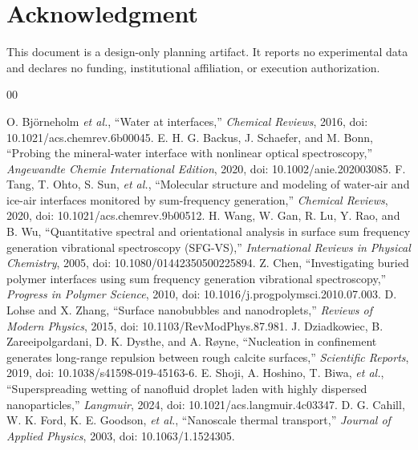 \documentclass[conference]{IEEEtran}
\begin{document}
\section*{Acknowledgment}

This document is a design-only planning artifact. It reports no experimental data and declares no funding, institutional affiliation, or execution authorization.

\begin{thebibliography}{00}

 O. Bj\"orneholm \emph{et al.}, ``Water at interfaces,'' \emph{Chemical Reviews}, 2016, doi: 10.1021/acs.chemrev.6b00045.
 E. H. G. Backus, J. Schaefer, and M. Bonn, ``Probing the mineral-water interface with nonlinear optical spectroscopy,'' \emph{Angewandte Chemie International Edition}, 2020, doi: 10.1002/anie.202003085.
 F. Tang, T. Ohto, S. Sun, \emph{et al.}, ``Molecular structure and modeling of water-air and ice-air interfaces monitored by sum-frequency generation,'' \emph{Chemical Reviews}, 2020, doi: 10.1021/acs.chemrev.9b00512.
 H. Wang, W. Gan, R. Lu, Y. Rao, and B. Wu, ``Quantitative spectral and orientational analysis in surface sum frequency generation vibrational spectroscopy (SFG-VS),'' \emph{International Reviews in Physical Chemistry}, 2005, doi: 10.1080/01442350500225894.
 Z. Chen, ``Investigating buried polymer interfaces using sum frequency generation vibrational spectroscopy,'' \emph{Progress in Polymer Science}, 2010, doi: 10.1016/j.progpolymsci.2010.07.003.
 D. Lohse and X. Zhang, ``Surface nanobubbles and nanodroplets,'' \emph{Reviews of Modern Physics}, 2015, doi: 10.1103/RevModPhys.87.981.
 J. Dziadkowiec, B. Zareeipolgardani, D. K. Dysthe, and A. R\o yne, ``Nucleation in confinement generates long-range repulsion between rough calcite surfaces,'' \emph{Scientific Reports}, 2019, doi: 10.1038/s41598-019-45163-6.
 E. Shoji, A. Hoshino, T. Biwa, \emph{et al.}, ``Superspreading wetting of nanofluid droplet laden with highly dispersed nanoparticles,'' \emph{Langmuir}, 2024, doi: 10.1021/acs.langmuir.4c03347.
 D. G. Cahill, W. K. Ford, K. E. Goodson, \emph{et al.}, ``Nanoscale thermal transport,'' \emph{Journal of Applied Physics}, 2003, doi: 10.1063/1.1524305.

\end{thebibliography}
\end{document}
